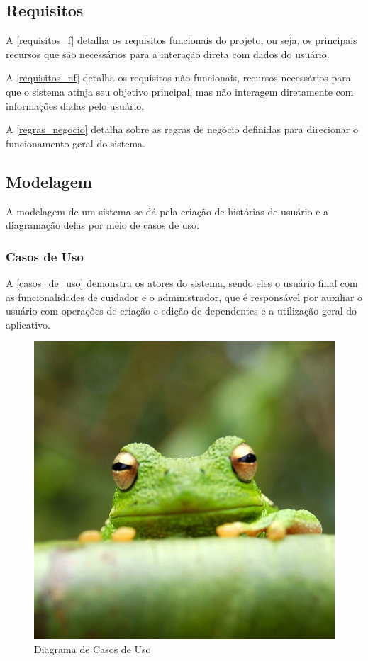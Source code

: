 \documentclass[
	article,			%
	12pt,				%
	oneside,			%
	a4paper,			%
    BIBLATEX,           %
	english,			%
	brazil,				%
	sumario=tradicional
	]{abntex2}
\begin{document}
\subsection{Requisitos}

A \autoref{requisitos_f} detalha os requisitos funcionais do projeto, ou seja, os principais recursos que são necessários para a interação direta com dados do usuário.

A \autoref{requisitos_nf} detalha os requisitos não funcionais, recursos necessários para que o sistema atinja seu objetivo principal, mas não interagem diretamente com informações dadas pelo usuário.

A \autoref{regras_negocio} detalha sobre as regras de negócio definidas para direcionar o funcionamento geral do sistema.

\subsection{Modelagem}

A modelagem de um sistema se dá pela criação de histórias de usuário e a diagramação delas por meio de casos de uso.

\subsubsection{Casos de Uso}

A \autoref{casos_de_uso} demonstra os atores do sistema, sendo eles o usuário final com as funcionalidades de cuidador e o administrador, que é responsável por auxiliar o usuário com operações de criação e edição de dependentes e a utilização geral do aplicativo.

\begin{figure}
    \centering
    \includegraphics[width=0.5\linewidth]{Figuras/frog.jpg}
    \caption{Diagrama de Casos de Uso}
    \label{casos_de_uso}
\end{figure}
\end{document}

